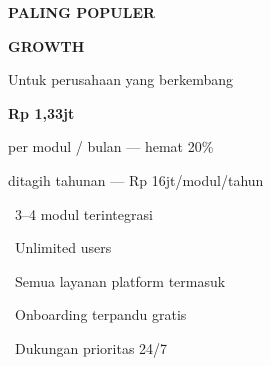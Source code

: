 \documentclass[a4paper]{article}
\begin{document}
\begin{minipage}[t]{0.318\textwidth}
    \colorbox{BluePrimary}{%
        \begin{minipage}[t][7.6cm][c]{\dimexpr\linewidth-2\fboxsep\relax}
            \begin{center}
                {\setlength{\fboxsep}{3pt}\colorbox{BlueDark}{{\fontsize{7}{9}\selectfont\bfseries\color{White} PALING POPULER}}}\par\vspace{4pt}
                {\fontsize{11}{14}\selectfont\bfseries\color{White} GROWTH}\par\vspace{2pt}
                {\fontsize{8}{10}\selectfont\color{BlueMid} Untuk perusahaan yang berkembang}\par\vspace{6pt}
                {\fontsize{20}{24}\selectfont\bfseries\color{White} Rp 1,33jt}\par\vspace{1pt}
                {\fontsize{8}{10}\selectfont\color{BlueMid} per modul / bulan --- hemat 20\%}\par\vspace{1pt}
                {\fontsize{7.5}{9}\selectfont\color{BlueMid} ditagih tahunan --- Rp 16jt/modul/tahun}\par\vspace{6pt}
            \end{center}
            {\fontsize{8.5}{12}\selectfont\color{White}%
            \textbullet\ 3--4 modul terintegrasi\par\vspace{2pt}%
            \textbullet\ Unlimited users\par\vspace{2pt}%
            \textbullet\ Semua layanan platform termasuk\par\vspace{2pt}%
            \textbullet\ Onboarding terpandu gratis\par\vspace{2pt}%
            \textbullet\ Dukungan prioritas 24/7}%
        \end{minipage}}
\end{minipage}%
\hfill
\end{document}

